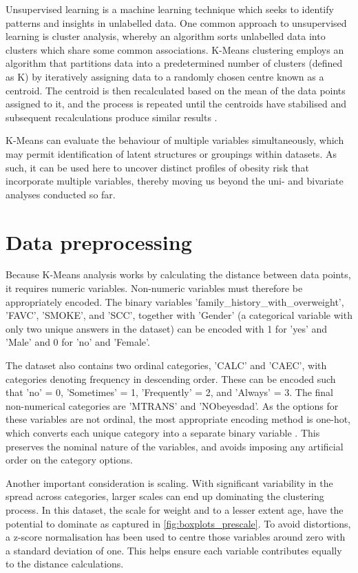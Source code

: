 Unsupervised learning is a machine learning technique which seeks to identify patterns and insights in unlabelled data. One common approach to unsupervised learning is cluster analysis, whereby an algorithm sorts unlabelled data into clusters which share some common associations. K-Means clustering employs an algorithm that partitions data into a predetermined number of clusters (defined as K) by iteratively assigning data to a randomly chosen centre known as a centroid. The centroid is then recalculated based on the mean of the data points assigned to it, and the process is repeated until the centroids have stabilised and subsequent recalculations produce similar results \cite{Geron2022}.
 
K-Means can evaluate the behaviour of multiple variables simultaneously, which may permit identification of latent structures or groupings within datasets. As such, it can be used here to uncover distinct profiles of obesity risk that incorporate multiple variables, thereby moving us beyond the uni- and bivariate analyses conducted so far. 

\section{Data preprocessing}
Because K-Means analysis works by calculating the distance between data points, it requires numeric variables. Non-numeric variables must therefore be appropriately encoded. The binary variables 'family\_history\_with\_overweight', 'FAVC', 'SMOKE', and 'SCC', together with 'Gender' (a categorical variable with only two unique answers in the dataset) can be encoded with 1 for 'yes' and 'Male' and 0 for 'no' and 'Female'. 

The dataset also contains two ordinal categories, 'CALC' and 'CAEC', with categories denoting frequency in descending order. These can be encoded such that 'no' = 0, 'Sometimes' = 1, 'Frequently' = 2, and 'Always' = 3. The final non-numerical categories are 'MTRANS' and 'NObeyesdad'. As the options for these variables are not ordinal, the most appropriate encoding method is one-hot, which converts each unique category into a separate binary variable \cite{Geron2022}. This preserves the nominal nature of the variables, and avoids imposing any artificial order on the category options. 

Another important consideration is scaling. With significant variability in the spread across categories, larger scales can end up dominating the clustering process. In this dataset, the scale for weight and to a lesser extent age, have the potential to dominate as captured in \ref{fig:boxplots_prescale}. To avoid distortions, a z-score normalisation has been used to centre those variables around zero with a standard deviation of one. This helps ensure each variable contributes equally to the distance calculations.  

